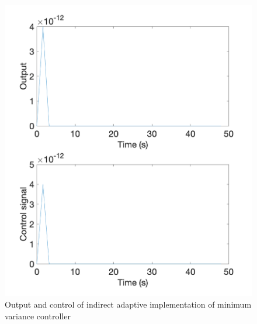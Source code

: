 \begin{figure}
	\centering
	\includegraphics[width=\textwidth]{images/sstr31.png}
	\caption{Output and control of indirect adaptive implementation of minimum variance controller}
	\label{fig:sstr31}
\end{figure}

